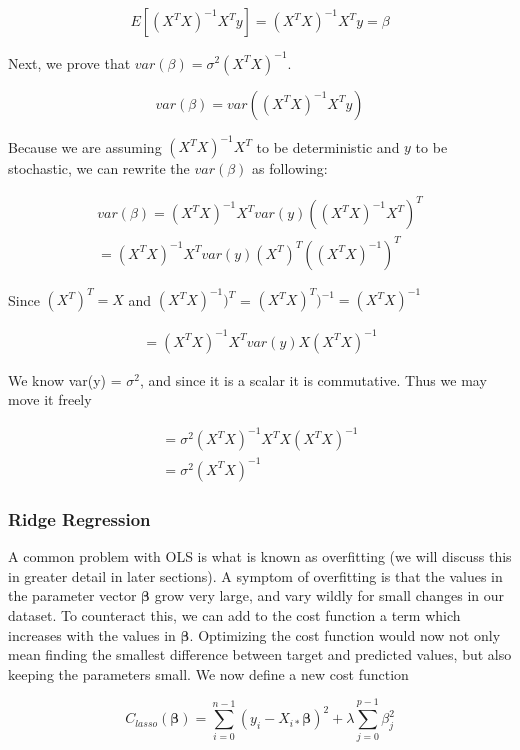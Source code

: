 \documentclass[twocolumn,10pt,cleanfoot]{asme2ej}
\begin{document}
\begin{equation}
E[(X^{T}X)^{-1}X^{T}y] = (X^{T}X)^{-1}X^{T}y = \beta
\end{equation}

Next, we prove that $var(\beta) = \sigma^{2}(X^{T}X)^{-1}$.

$$var(\beta) = var((X^{T}X)^{-1}X^{T}y)$$

Because we are assuming $(X^{T}X)^{-1}X^{T}$ to be deterministic and $y$ to be stochastic, we can rewrite the $var(\beta)$ as following:

\begin{gather}
var(\beta) = (X^{T}X)^{-1}X^{T}var(y)((X^{T}X)^{-1}X^{T})^{T} \\
= (X^{T}X)^{-1}X^{T}var(y)(X^{T})^{T}((X^{T}X)^{-1})^{T}
\end{gather}

Since $(X^{T})^{T} = X$ and $(X^{T}X)^{-1})^{T}$ = $(X^{T}X)^{T})^{-1} = (X^{T}X)^{-1}$

\begin{gather}
= (X^{T}X)^{-1}X^{T}var(y)X(X^{T}X)^{-1}
\end{gather}

We know var(y) = $\sigma^{2}$, and since it is a scalar it is commutative. Thus we may move it freely

\begin{gather}
= \sigma^{2}(X^{T}X)^{-1}X^{T}X(X^{T}X)^{-1} \\
= \sigma^{2}(X^{T}X)^{-1}
\end{gather}

\subsubsection{Ridge Regression}

	A common problem with OLS is what is known as overfitting (we will discuss this in greater detail in later sections). A symptom of overfitting is that the values in the parameter vector $\bm{\beta}$ grow very large, and vary wildly for small changes in our dataset. To counteract this, we can add to the cost function a term which increases with the values in $\bm{\beta}$. Optimizing the cost function would now not only mean finding the smallest difference between target and predicted values, but also keeping the parameters small. We now define a new cost function

\begin{equation}
	C_{lasso}(\bm{\beta}) = \sum_{i=0}^{n-1}(y_i-X_{i*}\bm{\beta})^2 + \lambda \sum_{j=0}^{p-1} \beta_j^2
\end{equation}
\end{document}
